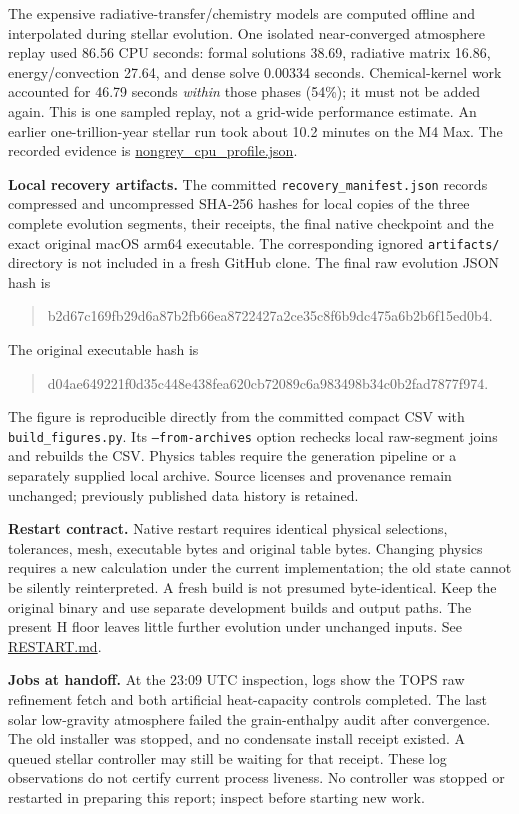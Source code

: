 \documentclass[11pt,letterpaper]{article}
\newcommand{\doc}[2]{\href{https://github.com/oklo/ember/blob/master/#1}{#2}}
\begin{document}
The expensive radiative-transfer/chemistry models are computed offline and
interpolated during stellar evolution. One isolated near-converged atmosphere
replay used 86.56 CPU seconds: formal solutions 38.69, radiative matrix 16.86,
energy/convection 27.64, and dense solve 0.00334 seconds. Chemical-kernel work
accounted for 46.79 seconds \emph{within} those phases (54\%); it must not be
added again. This is one sampled replay, not a grid-wide performance estimate.
An earlier one-trillion-year stellar run took about 10.2 minutes on the M4 Max.
The recorded evidence is
\doc{docs/results/nongrey_cpu_profile.json}{nongrey\_cpu\_profile.json}.

\textbf{Local recovery artifacts.} The committed \texttt{recovery\_manifest.json}
records compressed and uncompressed SHA-256 hashes for local copies of the three
complete evolution segments, their receipts, the final native checkpoint and
the exact original macOS arm64 executable. The corresponding ignored
\texttt{artifacts/} directory is not included in a fresh GitHub clone.
The final raw evolution JSON hash is
\begin{quote}\small\ttfamily
b2d67c169fb29d6a87b2fb66ea8722427a2ce35c8f6b9dc475a6b2b6f15ed0b4.
\end{quote}
The original executable hash is
\begin{quote}\small\ttfamily
d04ae649221f0d35c448e438fea620cb72089c6a983498b34c0b2fad7877f974.
\end{quote}
The figure is reproducible directly from the committed compact CSV with
\texttt{build\_figures.py}. Its \texttt{--from-archives} option rechecks local
raw-segment joins and rebuilds the CSV. Physics tables require the generation
pipeline or a separately supplied local archive. Source licenses and provenance
remain unchanged; previously published data history is retained.

\textbf{Restart contract.} Native restart requires identical physical
selections, tolerances, mesh, executable bytes and original table bytes.
Changing physics requires a new calculation under the current implementation;
the old state cannot be silently reinterpreted. A fresh build is not presumed
byte-identical. Keep the original binary and use separate development builds
and output paths. The present H floor leaves little further evolution under
unchanged inputs. See \doc{docs/RESTART.md}{RESTART.md}.

\textbf{Jobs at handoff.} At the 23:09 UTC inspection, logs show the TOPS raw
refinement fetch and both artificial heat-capacity controls completed. The last
solar low-gravity atmosphere failed the grain-enthalpy audit after convergence.
The old installer was stopped, and no condensate install receipt existed.
A queued stellar controller may still be waiting for that receipt. These log
observations do not certify current process liveness. No controller was stopped
or restarted in preparing this report; inspect before starting new work.
\end{document}
